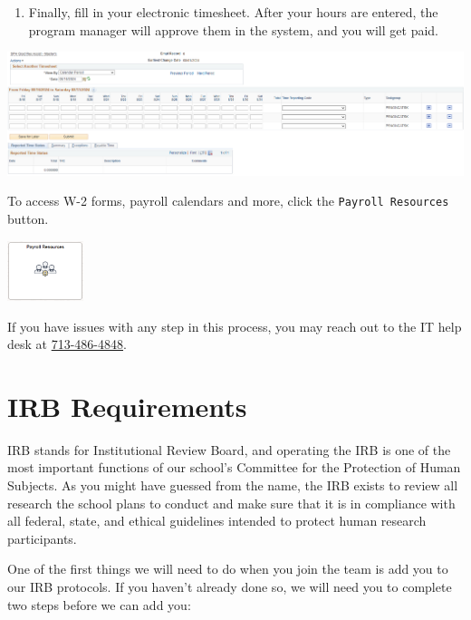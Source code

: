 \documentclass[
  letterpaper,
  DIV=11,
  numbers=noendperiod]{scrreprt}
\providecommand{\tightlist}{%
  \setlength{\itemsep}{0pt}\setlength{\parskip}{0pt}}\usepackage{longtable,booktabs,array}
\begin{document}
\begin{enumerate}
\def\labelenumi{\arabic{enumi}.}
\setcounter{enumi}{5}
\tightlist
\item
  Finally, fill in your electronic timesheet. After your hours are
  entered, the program manager will approve them in the system, and you
  will get paid.
\end{enumerate}

\begin{center}
\includegraphics[width=5.58in,height=\textheight]{chapters/../graphics/timesheet.png}
\end{center}

To access W-2 forms, payroll calendars and more, click the
\texttt{Payroll\ Resources} button.

\begin{center}
\includegraphics[width=0.87in,height=\textheight]{chapters/../graphics/payroll_resources.png}
\end{center}

If you have issues with any step in this process, you may reach out to
the IT help desk at \href{tel:7134864848}{713-486-4848}.

\section{IRB Requirements}\label{irb-requirements}

IRB stands for Institutional Review Board, and operating the IRB is one
of the most important functions of our school's Committee for the
Protection of Human Subjects. As you might have guessed from the name,
the IRB exists to review all research the school plans to conduct and
make sure that it is in compliance with all federal, state, and ethical
guidelines intended to protect human research participants.

One of the first things we will need to do when you join the team is add
you to our IRB protocols. If you haven't already done so, we will need
you to complete two steps before we can add you:
\end{document}
